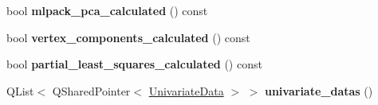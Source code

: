 \begin{DoxyCompactItemize}
\item 
bool {\bfseries mlpack\+\_\+pca\+\_\+calculated} () const \hypertarget{class_vespucci_dataset_afa476fc682004d28022772fe9a69ad84}{}\label{class_vespucci_dataset_afa476fc682004d28022772fe9a69ad84}

\item 
bool {\bfseries vertex\+\_\+components\+\_\+calculated} () const \hypertarget{class_vespucci_dataset_a9c41c9eb801e1b2975a116a98d5db539}{}\label{class_vespucci_dataset_a9c41c9eb801e1b2975a116a98d5db539}

\item 
bool {\bfseries partial\+\_\+least\+\_\+squares\+\_\+calculated} () const \hypertarget{class_vespucci_dataset_a71051b9a0ee9979813f7a3dea7df2b03}{}\label{class_vespucci_dataset_a71051b9a0ee9979813f7a3dea7df2b03}

\item 
Q\+List$<$ Q\+Shared\+Pointer$<$ \hyperlink{class_univariate_data}{Univariate\+Data} $>$ $>$ {\bfseries univariate\+\_\+datas} ()\hypertarget{class_vespucci_dataset_a46d54da457bd2e8a5458a23e814db72c}{}\label{class_vespucci_dataset_a46d54da457bd2e8a5458a23e814db72c}


\end{DoxyCompactItemize}
